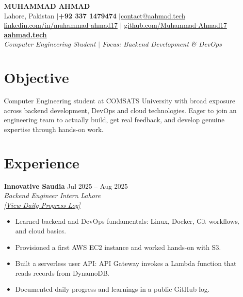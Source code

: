 \documentclass[a4paper,10.5pt]{article}
\newcommand{\entrytitle}[2]{%
  \textbf{#1} \hfill #2%
}
\newcommand{\entrysubtitle}[2]{%
  \textit{#1} \hfill \textit{#2}%
}
\begin{document}
\begin{center}
  {\sffamily\Huge\textbf{MUHAMMAD AHMAD}} \\[5pt]
  Lahore, Pakistan \enspace$|$\enspace \textbf{+92 337 1479474} \enspace$|$\enspace \href{mailto:contact@aahmad.tech}{contact@aahmad.tech} \\[2pt]
  \href{https://linkedin.com/in/muhammad-ahmad17}{linkedin.com/in/muhammad-ahmad17} \enspace$|$\enspace
  \href{https://github.com/Muhammad-Ahmad17}{github.com/Muhammad-Ahmad17} \\[4pt]
  \textbf{\href{https://aahmad.tech}{aahmad.tech}} \\[3pt]
  \textit{Computer Engineering Student $|$ Focus: Backend Development \& DevOps}
\end{center}

\section{Objective}
Computer Engineering student at COMSATS University with broad exposure across backend development, DevOps and cloud technologies. Eager to join an engineering team to actually build, get real feedback, and develop genuine expertise through hands-on work.

\section{Experience}

\entrytitle{Innovative Saudia}{Jul 2025 -- Aug 2025} \\
\entrysubtitle{Backend Engineer Intern}{Lahore} \\
{\small\textit{\href{https://github.com/Muhammad-Ahmad17/Internship}{[View Daily Progress Log]}}}
\normalsize
\begin{itemize}[nosep, leftmargin=1.5em, topsep=2pt]
  \item Learned backend and DevOps fundamentals: Linux, Docker, Git workflows, and cloud basics.
  \item Provisioned a first AWS EC2 instance and worked hands-on with S3.
  \item Built a serverless user API: API Gateway invokes a Lambda function that reads records from DynamoDB.
  \item Documented daily progress and learnings in a public GitHub log.
\end{itemize}
\end{document}
